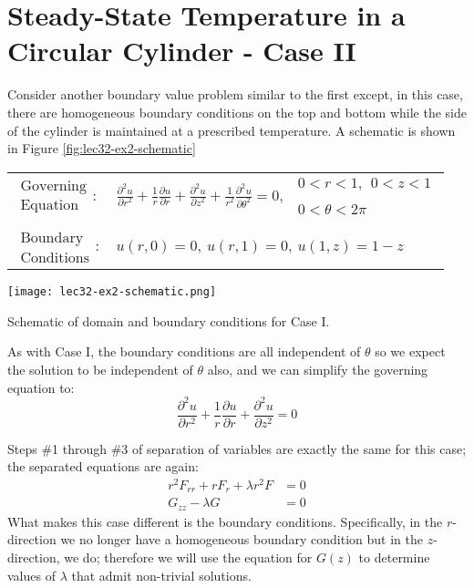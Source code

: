\section{Steady-State Temperature in a Circular Cylinder - Case II}
Consider another boundary value problem similar to the first except, in this case, there are homogeneous boundary conditions on the top and bottom while the side of the cylinder is maintained at a prescribed temperature.  A schematic is shown in Figure \ref{fig:lec32-ex2-schematic}
\begin{table}[h]
\begin{tabular}{l l}
$\substack{\text{Governing} \\\text{Equation}}: $& $\frac{\partial^2 u}{\partial r^2} + \frac{1}{r}\frac{\partial u}{\partial r} + \frac{\partial^2 u}{\partial z^2} + \frac{1}{r^2}\frac{\partial^2 u}{\partial \theta^2}= 0, \ \ \substack{0<r<1, \ \ 0<z<1 \\ \\ 0<\theta<2 \pi}$\\
& \\
$\substack{\text{Boundary} \\ \text{Conditions}}: $ & $u(r,0) = 0, \ u(r,1) = 0, \ u(1,z) = 1-z$  \\ 
\end{tabular}
\end{table} 
\begin{marginfigure}
\texttt{[image: lec32-ex2-schematic.png]}
\caption{Schematic of domain and boundary conditions for Case I.}
\label{fig:lec32-ex2-schematic}
\end{marginfigure}
As with Case I, the boundary conditions are all independent of $\theta$ so we expect the solution to be independent of $\theta$ also, and we can simplify the governing equation to:
\begin{equation*}
\frac{\partial^2 u}{\partial r^2} + \frac{1}{r}\frac{\partial u}{\partial r} + \frac{\partial^2 u}{\partial z^2} = 0
\end{equation*}

 Steps \#1 through \#3 of separation of variables are exactly the same for this case; the separated equations are again:
\begin{align*}
r^2F_{rr} + rF_r + \lambda r^2 F &= 0 \\
G_{zz} - \lambda G &= 0
\end{align*}
What makes this case different is the boundary conditions.  Specifically, in the $r$-direction we no longer have a homogeneous boundary condition but in the $z$-direction, we do; therefore we will use the equation for $G(z)$ to determine values of $\lambda$ that admit non-trivial solutions.

